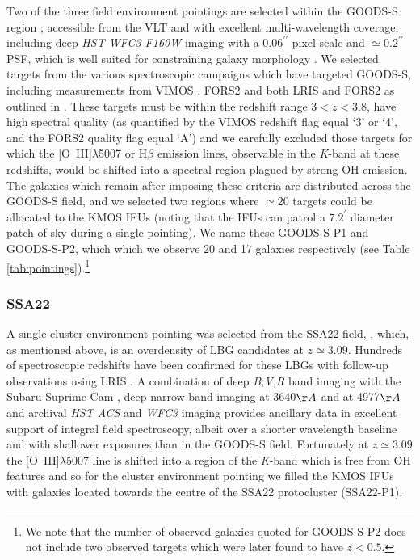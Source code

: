 \documentclass[fleqn,usenatbib]{mnras}
\begin{document}
Two of the three field environment pointings are selected within the GOODS-S region \citep{Guo2013}; accessible from the VLT and with excellent multi-wavelength coverage, including deep {\em HST WFC3 F160W} imaging with a $0.06^{\prime\prime}$ pixel scale and $\simeq0.2^{\prime\prime}$ PSF, which is well suited for constraining galaxy morphology \citep{Grogin2011,Koekemoer2011}.
We selected targets from the various spectroscopic campaigns which have targeted GOODS-S, including measurements from VIMOS \citep{Balestra2010,Cassata2014}, FORS2 \citep{Vanzella2005,Vanzella2006,Vanzella2008} and both LRIS and FORS2 as outlined in \cite{Wuyts2009}.
These targets must be within the redshift range $3 < z < 3.8$, have high spectral quality (as quantified by the VIMOS redshift flag equal `3' or `4', and the FORS2 quality flag equal `A') and we carefully excluded those targets for which the [O~{\sc III}]$\lambda$5007 or H$\beta$ emission lines, observable in the {\it K}-band at these redshifts, would be shifted into a spectral region plagued by strong OH emission.
The galaxies which remain after imposing these criteria are distributed across the GOODS-S field, and we selected two regions where $\simeq20$ targets could be allocated to the KMOS IFUs (noting that the IFUs can patrol a $7.2^{\prime}$ diameter patch of sky during a single pointing).
We name these GOODS-S-P1 and GOODS-S-P2, which which we observe 20 and 17 galaxies respectively (see Table \ref{tab:pointings}).\footnote{We note that the number of observed galaxies quoted for GOODS-S-P2 does not include two observed targets which were later found to have $z < 0.5$.}

\subsubsection{SSA22}\label{subsubsec:sample_selection_ssa}
A single cluster environment pointing was selected from the SSA22 field, \citep{Steidel1998,Steidel2000,Steidel2003,Shapley2003}, which, as mentioned above, is an overdensity of LBG candidates at $z\simeq3.09$.
Hundreds of spectroscopic redshifts have been confirmed for these LBGs with follow-up observations using LRIS \citep{Shapley2003,Nestor2013}.
A combination of deep {\em B,V,R} band imaging with the Subaru Suprime-Cam \citep{Matsuda2004}, deep narrow-band imaging at 3640$\AA$ \citep{Matsuda2004} and at 4977$\AA$ \citep{Nestor2011,Yamada2012a} and archival {\em HST ACS} and {\it WFC3} imaging provides ancillary data in excellent support of integral field spectroscopy, albeit over a shorter wavelength baseline and with shallower exposures than in the GOODS-S field.
Fortunately at $z\simeq3.09$ the [O~{\sc III}]$\lambda$5007 line is shifted into a region of the {\it K}-band which is free from OH features and so for the cluster environment pointing we filled the KMOS IFUs with galaxies located towards the centre of the SSA22 protocluster (SSA22-P1).
\end{document}
